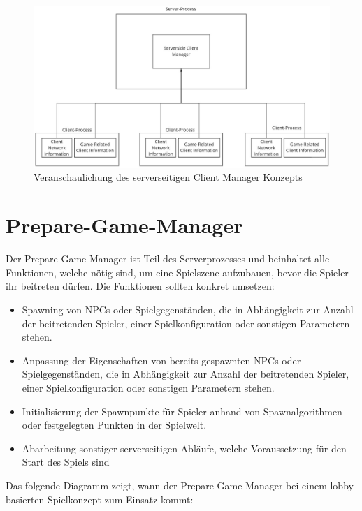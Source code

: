 \begin{figure}[H]
	\centering
	\includegraphics[width=120mm]{images/serversided_client_manager.jpg}
	\caption[Serversided Client Manager]{Veranschaulichung des serverseitigen Client Manager Konzepts}
	\label{pic:serversided_client_manager}
\end{figure}

\section{Prepare-Game-Manager}

Der Prepare-Game-Manager ist Teil des Serverprozesses und beinhaltet alle Funktionen, welche nötig sind, um eine Spielszene aufzubauen, bevor die Spieler ihr beitreten dürfen. Die Funktionen sollten konkret umsetzen:

\begin{itemize}
	\item Spawning \cite{Wikipedia.2020} von NPCs \cite{Wikipedia.2021f} oder Spielgegenständen, die in Abhängigkeit zur Anzahl der beitretenden Spieler, einer Spielkonfiguration oder sonstigen Parametern stehen.
	\item Anpassung der Eigenschaften von bereits gespawnten NPCs oder Spielgegenständen, die in Abhängigkeit zur Anzahl der beitretenden Spieler, einer Spielkonfiguration oder sonstigen Parametern stehen.
	\item Initialisierung der Spawnpunkte für Spieler anhand von Spawnalgorithmen oder festgelegten Punkten in der Spielwelt.
	\item Abarbeitung sonstiger serverseitigen Abläufe, welche Voraussetzung für den Start des Spiels sind
\end{itemize}

Das folgende Diagramm zeigt, wann der Prepare-Game-Manager bei einem lobby-basierten Spielkonzept zum Einsatz kommt:


